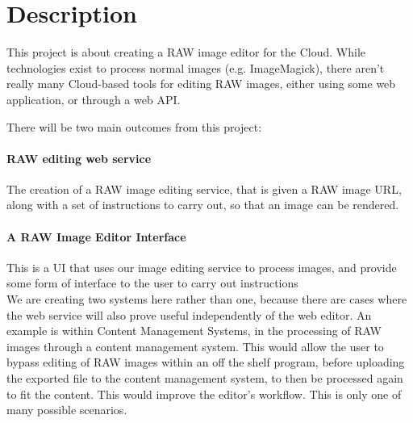 \documentclass[14pt]{article}
\begin{document}
\maketitle

\section{Description}
  This project is about creating a RAW image editor for the Cloud. While technologies
  exist to process normal images (e.g. ImageMagick), there aren't really many Cloud-based
  tools for editing RAW images, either using some web application, or through a web API.

  There will be two main outcomes from this project:

  \paragraph{RAW editing web service}
    The creation of a RAW image editing service, that is given a RAW image URL,
    along with a set of instructions to carry out, so that an image can be rendered.

  \paragraph{A RAW Image Editor Interface}
    This is a UI that uses our image editing service to process images, and provide
    some form of interface to the user to carry out instructions
    \\
    We are creating two systems here rather than one, because there are cases where the
    web service will also prove useful independently of the web editor. An example is within
    Content Management Systems, in the processing of RAW images through a content management system.
    This would allow the user to bypass editing of RAW images within an off the shelf program, before
    uploading the exported file to the content management system, to then be processed again to fit the content.
    This would improve the editor's workflow. This is only one of many possible scenarios.
\end{document}
